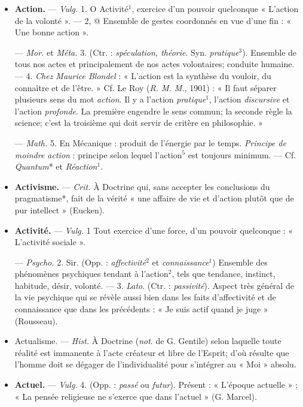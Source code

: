 \begin{itemize}[leftmargin=1cm, label=, itemsep=1pt]
\item {\bf Action.} — \textsf{\textit {Vulg.}} 1. O Activité$^1$, exercice d’un pouvoir quelconque
« L'action de la volonté ». — 2, @
Ensemble de gestes coordonnés
en vue d'une fin : « Une bonne
action ».

— \textsf{\textit {Mor.}} et \textsf{\textit {Méta.}} 3. (Ctr. : {\it spéculation, théorie}. Syn. {\it pratique}$^3$).
Ensemble de tous nos actes et principalement de nos actes volontaires;
conduite humaine. — 4. {\it Chez Maurice Blondel} : « L'action est la
synthèse du vouloir, du connaître et de
l'être. » Cf. Le Roy ({\it R. M. M.}, 1901) :
« Il faut séparer plusieurs sens du
mot {\it action}. Il y a l’action {\it pratique}$^1$,
l’action {\it discursive} et l'action {\it profonde}. La première engendre le sens
commun; la seconde règle la science;
c’est la troisième qui doit servir de
critère en philosophie. »

— \textsf{\textit {Math.}} 5. En Mécanique : produit de l'énergie par le temps.
{\it Principe de moindre action} : principe
selon lequel l’action$^5$ est toujours
minimum. — Cf. {\it Quantum}* et
{\it Réaction}$^1$.

\item {\bf Activisme.} — \textsf{\textit {Crit.}} À Doctrine qui, 
sans accepter les conclusions du
pragmatisme*, fait de la vérité
« une affaire de vie et d’action plutôt
que de pur intellect » (Eucken).

\item {\bf Activité.} — \textsf{\textit {Vulg.}} 1 Tout exercice
d’une force, d’un pouvoir quelconque : « L'activité sociale ».

— \textsf{\textit {Psycho.}} 2. Sir. (Opp. : {\it affectivité}$^2$ et {\it connaissance}$^1$) Ensemble
des phénomènes psychiques tendant
à l’action$^2$, tels que tendance, instinct, habitude, désir, volonté. —
3. {\it Lato}. (Ctr. : {\it passivité}). Aspect
très général de la vie psychique qui
se révèle aussi bien dans les faits
d’affectivité et de connaissance que
dans les précédents : « Je suis actif
quand je juge » (Rousseau).

\item {\bf }Actualisme. — \textsf{\textit {Hist.}} À Doctrine ({\it not}.
de G. Gentile) selon laquelle toute
réalité est immanente à l'acte créateur et libre de l'Esprit; d’où résulte
que l'homme doit se dégager de
l'individualité pour s'intégrer au
« Moi » absolu.

\item {\bf Actuel.} — \textsf{\textit {Vulg.}} 4. (Opp. : {\it passé} ou
{\it futur}). Présent : « L'époque actuelle » ;
« La pensée religieuse ne s'exerce que
dans l’actuel » (G. Marcel).


\end{itemize}
